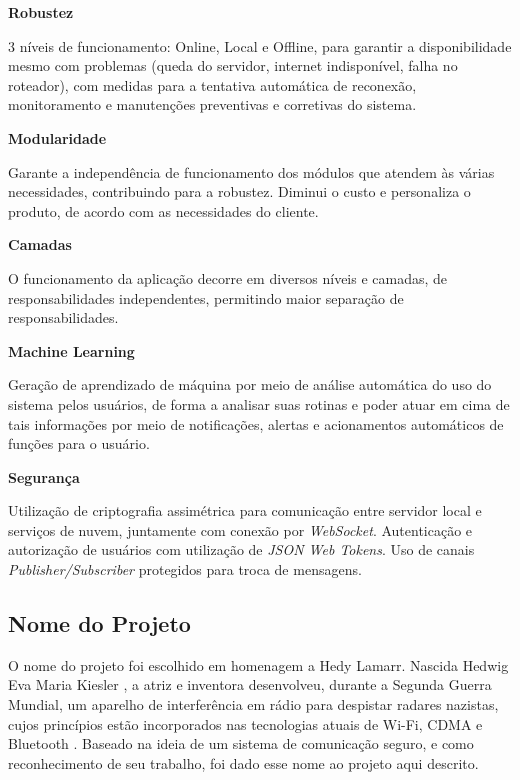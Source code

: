 \begin{description}
\item \textbf{Robustez}

3 níveis de funcionamento: Online, Local e Offline, para garantir a disponibilidade mesmo com problemas (queda do servidor, internet indisponível, falha no roteador), com medidas para a tentativa automática de reconexão, monitoramento e manutenções preventivas e corretivas do sistema.

\item \textbf{Modularidade}

Garante a independência de funcionamento dos módulos que atendem às várias necessidades, contribuindo para a robustez. Diminui o custo e personaliza o produto, de acordo com as necessidades do cliente.

\item \textbf{Camadas}

O funcionamento da aplicação decorre em diversos níveis e camadas, de responsabilidades independentes, permitindo maior separação de responsabilidades.

\item \textbf{Machine Learning}

Geração de aprendizado de máquina por meio de análise automática do uso do sistema pelos usuários, de forma a analisar suas rotinas e poder atuar em cima de tais informações por meio de notificações, alertas e acionamentos automáticos de funções para o usuário.

\item \textbf{Segurança}

Utilização de criptografia assimétrica para comunicação entre servidor local e serviços de nuvem, juntamente com conexão por \textit{WebSocket}. Autenticação e autorização de usuários com utilização de \textit{JSON Web Tokens}. Uso de canais \textit{Publisher/Subscriber} protegidos para troca de mensagens.

\end{description}

\subsection{Nome do Projeto}
O nome do projeto foi escolhido em homenagem a Hedy Lamarr. Nascida Hedwig Eva Maria Kiesler \cite{shearer}, a atriz e inventora desenvolveu, durante a Segunda Guerra Mundial, um aparelho de interferência em rádio para despistar radares nazistas, cujos princípios estão incorporados nas tecnologias atuais de Wi-Fi, CDMA e Bluetooth \cite{electronicFrontier}. Baseado na ideia de um sistema de comunicação seguro, e como reconhecimento de seu trabalho, foi dado esse nome ao projeto aqui descrito.

